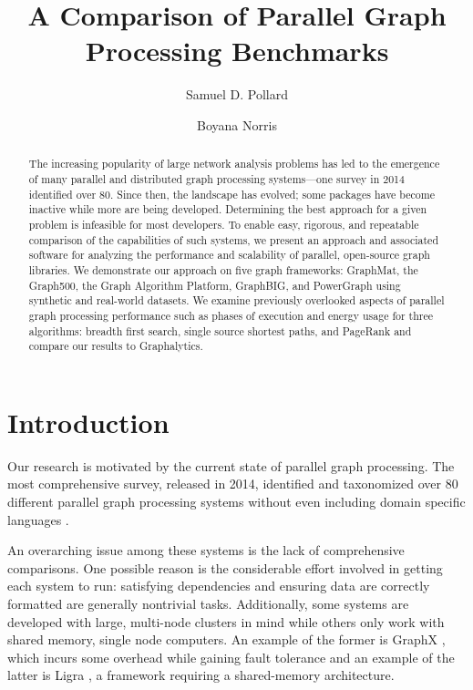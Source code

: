 \documentclass{llncs}
\begin{document}
\title{A Comparison of Parallel Graph Processing Benchmarks}
\author{Samuel D. Pollard \and Boyana Norris}
\maketitle
\begin{abstract}
The increasing popularity of large network analysis problems has led to the emergence of many parallel and distributed graph processing systems---one survey in 2014 identified over 80. Since then, the landscape has evolved; some packages have become inactive while more are being developed. Determining the best approach for a given problem is infeasible for most developers. To enable easy, rigorous, and repeatable comparison of the capabilities of such systems, we present an approach and associated software for analyzing the performance and scalability of parallel, open-source graph libraries. We demonstrate our approach on five graph frameworks: GraphMat, the Graph500, the Graph Algorithm Platform, GraphBIG, and PowerGraph using synthetic and real-world datasets. We examine previously overlooked aspects of parallel graph processing performance such as phases of execution and energy usage for three algorithms: breadth first search, single source shortest paths, and PageRank and compare our results to Graphalytics.
\end{abstract}

\section{Introduction}

Our research is motivated by the current state of parallel graph processing. The most comprehensive survey, released in 2014, identified and taxonomized over 80 different parallel graph processing systems without even including domain specific languages \cite{Doekemeijer:2015:GPFSurvey}.

An overarching issue among these systems is the lack of comprehensive comparisons. One possible reason is the considerable effort involved in getting each system to run: satisfying dependencies and ensuring data are correctly formatted are generally nontrivial tasks. Additionally, some systems are developed with large, multi-node clusters in mind while others only work with shared memory, single node computers. An example of the former is GraphX \cite{Xin:2013:GraphX}, which incurs some overhead while gaining fault tolerance and an example of the latter is Ligra \cite{Shun:2013:Ligra}, a framework requiring a shared-memory architecture.
\end{document}
